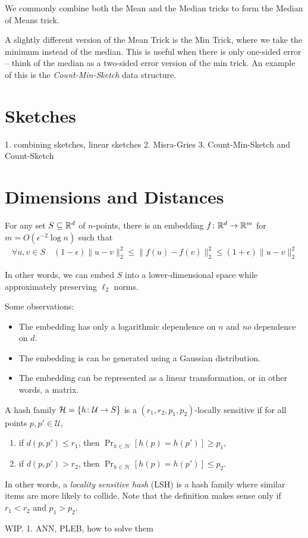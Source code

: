 \documentclass{article}
\begin{document}
We commonly combine both the Mean and the Median tricks to form the Median of Means trick.

A slightly different version of the Mean Trick is the Min Trick, where we take the minimum instead of the median.
This is useful when there is only one-sided error -- think of the median as a two-sided error version of the min trick.
An example of this is the \emph{Count-Min-Sketch} data structure.

\section{Sketches}

1. combining sketches, linear sketches
2. Misra-Gries
3. Count-Min-Sketch and Count-Sketch

\section{Dimensions and Distances}

\begin{lemma}
For any set $S \subseteq \mathbb{R}^d$ of $n$-points, there is an embedding $f \colon \mathbb{R}^d \to \mathbb{R}^m$ for $m = O(\epsilon^{-2} \log n)$ such that
\begin{align}
  \forall u, v \in S \quad (1 - \epsilon) \|u - v\|_2^2 \le \|f(u) - f(v)\|_2^2 \le (1 + \epsilon) \|u - v\|_2^2
\end{align}
\end{lemma}
In other words, we can embed $S$ into a lower-dimensional space while approximately preserving $\ell_2$ norms.

Some observations:
\begin{itemize}
  \item The embedding has only a logarithmic dependence on $n$ and \emph{no} dependence on $d$.
  \item The embedding is can be generated using a Gaussian distribution.
  \item The embedding can be represented as a linear transformation, or in other words, a matrix.
\end{itemize}

\begin{definition}
  A hash family $\mathcal{H} = \{h \colon \mathcal{U} \to S\}$ is a $(r_1, r_2, p_1, p_2)$-locally sensitive if for all points $p, p' \in \mathcal{U}$,

  \begin{enumerate}
    \item if $d(p, p') \le r_1$, then $\Pr_{h \in \mathcal{H}}[h(p) = h(p')] \ge p_1$,
    \item if $d(p, p') > r_2$, then $\Pr_{h \in \mathcal{H}}[h(p) = h(p')] \le p_2$.
  \end{enumerate}

\end{definition}
In other words, a \emph{locality sensitive hash} (LSH) is a hash family where similar items are more likely to collide.
Note that the definition makes sense only if $r_1 < r_2$ and $p_1 > p_2$.

WIP.
1. ANN, PLEB, how to solve them
\end{document}
